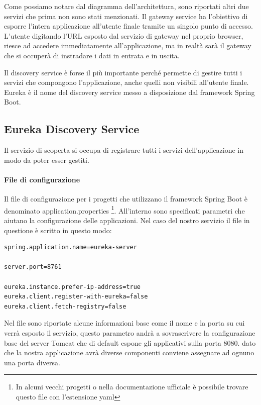 Come possiamo notare dal diagramma dell'architettura, sono riportati altri due servizi che prima non sono stati menzionati. Il gateway service ha l'obiettivo di esporre l'intera applicazione all'utente finale tramite un singolo punto di accesso. L'utente digitando l'\ac{URL} esposto dal servizio di gateway nel proprio browser, riesce ad accedere immediatamente all'applicazione, ma in realtà sarà il gateway che si occuperà di instradare i dati in entrata e in uscita.

Il discovery service è forse il più importante perché permette di gestire tutti i servizi che compongono l'applicazione, anche quelli non visibili all'utente finale. Eureka è il nome del discovery service messo a disposizione dal framework Spring Boot.




\subsection{Eureka Discovery Service}
Il servizio di scoperta si occupa di registrare tutti i servizi dell'applicazione in modo da poter esser gestiti. 

\paragraph{File di configurazione}
Il file di configurazione per i progetti che utilizzano il framework Spring Boot è denominato application.properties \footnote{In alcuni vecchi progetti o nella documentazione ufficiale è possibile trovare questo file con l'estensione yaml}. All'interno sono specificati parametri che aiutano la configurazione delle applicazioni. Nel caso del nostro servizio il file in questione è scritto in questo modo:

\begin{lstlisting}[caption=Application.properties di Eureka]
spring.application.name=eureka-server

server.port=8761

eureka.instance.prefer-ip-address=true
eureka.client.register-with-eureka=false
eureka.client.fetch-registry=false
\end{lstlisting}

Nel file sono riportate alcune informazioni base come il nome e la porta su cui verrà esposto il servizio, questo parametro andrà a sovrascrivere la configurazione base del server Tomcat che di default espone gli applicativi sulla porta 8080. dato che la nostra applicazione avrà diverse componenti conviene assegnare ad ognuno una porta diversa.

